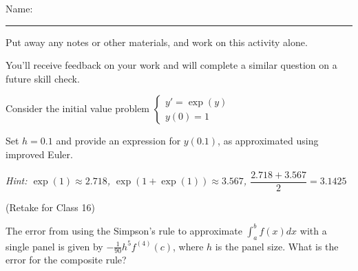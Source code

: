 \documentclass[12pt,letterpaper,noanswers]{exam}
\begin{document}
 \pdfpageheight 11in 
  \pdfpagewidth 8.5in

\noindent Name: \rule{2.5in}{0.5pt}

\noindent Put away any notes or other materials, and work on this activity alone.

\noindent You'll receive feedback on your work and will complete a similar question on a future skill check.


\begin{questions}
\item Consider the initial value problem $\left\{\begin{array}{l}
y' = \exp(y) \\
y(0) = 1
\end{array}
\right.$

Set $h = 0.1$ and provide an expression for $y(0.1)$, as approximated using improved Euler.

\emph{Hint: $\exp(1)\approx2.718$, $\exp(1+\exp(1))\approx3.567$, $\dfrac{2.718+3.567}{2}=3.1425$}


\vspace{8.5cm}

\item (Retake for Class 16)

The error from using the Simpson's rule to approximate $\int_a^b f(x)dx$ with a single panel is given by $-\frac{1}{90}h^5f^{(4)}(c)$, where $h$ is the panel size.  What is the error for the composite rule?

\end{questions}
\end{document}
